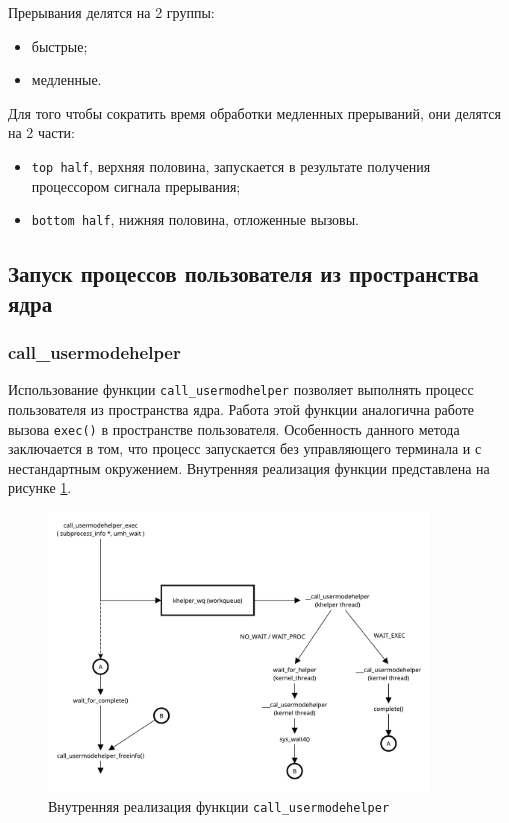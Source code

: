 Прерывания делятся на 2 группы:

\begin{itemize}
	\item быстрые;
	\item медленные. 
\end{itemize}

Для того чтобы сократить время обработки медленных прерываний, они делятся на 2 части:

\begin{itemize}
	\item \texttt{top half}, верхняя половина, запускается в результате получения процессором сигнала прерывания;
	\item \texttt{bottom half}, нижняя половина, отложенные вызовы.
\end{itemize}

\subsection{Запуск процессов пользователя из пространства ядра}

\subsubsection{call\_usermodehelper}

Использование функции \texttt{call\_usermodhelper} \cite{src} позволяет выполнять процесс пользователя из пространства ядра. Работа этой функции аналогична работе вызова \texttt{exec()} в пространстве пользователя. Особенность данного метода заключается в том, что процесс запускается без управляющего терминала и с нестандартным окружением. Внутренняя реализация функции представлена на рисунке \ref{fig:umh}.

\begin{figure}[h!btp]
	\centering
	\includegraphics[width=0.9\textwidth]{inc/usermodehelper.pdf}
	\caption{Внутренняя реализация функции \texttt{call\_usermodehelper}}
	\label{fig:umh}	
\end{figure}

